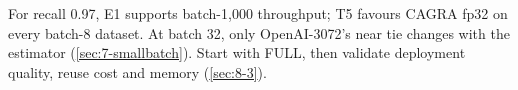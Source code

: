 For recall 0.97, E1 supports batch-1,000 throughput; T5 favours CAGRA fp32 on every batch-8 dataset. At batch 32, only OpenAI-3072's near tie changes with the estimator (\cref{sec:7-smallbatch}). Start with FULL, then validate deployment quality, reuse cost and memory (\cref{sec:8-3}).